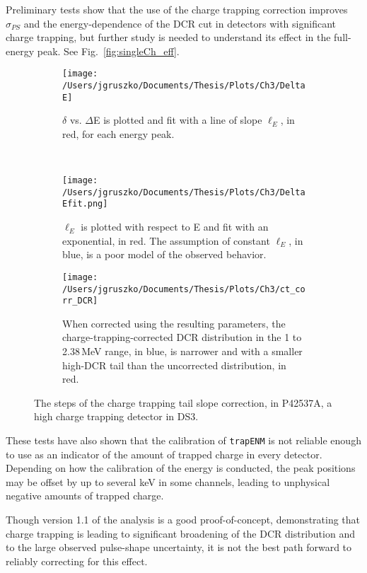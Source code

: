 Preliminary tests show that the use of the charge trapping correction improves $\sigma_{PS}$ and the energy-dependence of the DCR cut in detectors with significant charge trapping, but further study is needed to understand its effect in the full-energy peak. See Fig.~\ref{fig:singleCh_eff}. 

\begin{figure}[]
 \begin{subfigure}[t]{.45\textwidth}
 \texttt{[image: /Users/jgruszko/Documents/Thesis/Plots/Ch3/DeltaE]}
 \caption{$\delta$ vs. $\Delta$E is plotted and fit with a line of slope $\ell_E$, in red, for each energy peak.}
 \label{fig:DeltaE}
 \end{subfigure}
~
 \begin{subfigure}[t]{.45\textwidth}
 \texttt{[image: /Users/jgruszko/Documents/Thesis/Plots/Ch3/DeltaEfit.png]}
 \caption{$\ell_E$ is plotted with respect to E and fit with an exponential, in red. The assumption of constant $\ell_E$, in blue, is a poor model of the observed behavior.}
 \label{fig:DeltaEfit}
 \end{subfigure}
   \centering
 \begin{subfigure}[]{.7\textwidth}
 \texttt{[image: /Users/jgruszko/Documents/Thesis/Plots/Ch3/ct\_corr\_DCR]}
 \caption{When corrected using the resulting parameters, the charge-trapping-corrected DCR distribution in the 1 to 2.38\,MeV range, in blue, is narrower and with a smaller high-DCR tail than the uncorrected distribution, in red.}
 \label{fig:ct_corr_DCR}
 \end{subfigure}
 \caption[The steps of the charge trapping tail slope correction]{The steps of the charge trapping tail slope correction, in P42537A, a high charge trapping detector in DS3.} 
 \label{fig:ct_corr}
\end{figure}

These tests have also shown that the calibration of {\tt trapENM} is not reliable enough to use as an indicator of the amount of trapped charge in every detector. Depending on how the calibration of the energy is conducted, the peak positions may be offset by up to several keV in some channels, leading to unphysical negative amounts of trapped charge. 

Though version 1.1 of the analysis is a good proof-of-concept, demonstrating that charge trapping is leading to significant broadening of the DCR distribution and to the large observed pulse-shape uncertainty, it is not the best path forward to reliably correcting for this effect. 

